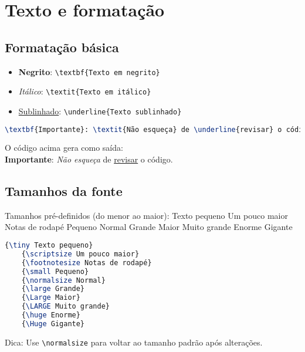 \chapter{Texto e formatação}



\section{Formatação básica}

\begin{itemize}
    \item \textbf{Negrito}: \verb|\textbf{Texto em negrito}|
    \item \textit{Itálico}: \verb|\textit{Texto em itálico}|
    \item \underline{Sublinhado}: \verb|\underline{Texto sublinhado}|
\end{itemize}

\begin{lstlisting}[language=tex, caption=Formatação básica de texto]
    \textbf{Importante}: \textit{Não esqueça} de \underline{revisar} o código.
\end{lstlisting}

O código acima gera como saída:\\

\textbf{Importante}: \textit{Não esqueça} de \underline{revisar} o código.

\section{Tamanhos da fonte}

Tamanhos pré-definidos (do menor ao maior):
{\tiny Texto pequeno}  
{\scriptsize Um pouco maior}  
{\footnotesize Notas de rodapé}  
{\small Pequeno}  
{\normalsize Normal}  
{\large Grande}  
{\Large Maior}  
{\LARGE Muito grande}  
{\huge Enorme}  
{\Huge Gigante}

\begin{lstlisting}[language=tex, caption=Tamanhos de fontes pré-definidos]
    {\tiny Texto pequeno}  
    {\scriptsize Um pouco maior}  
    {\footnotesize Notas de rodapé}  
    {\small Pequeno}  
    {\normalsize Normal}  
    {\large Grande}  
    {\Large Maior}  
    {\LARGE Muito grande}  
    {\huge Enorme}  
    {\Huge Gigante}  
\end{lstlisting}

Dica: Use \verb|\normalsize| para voltar ao tamanho padrão após alterações.

